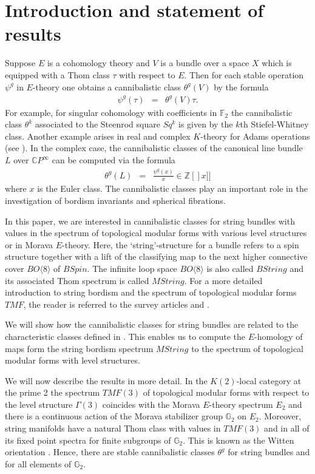 \documentclass{amsart}
\newcommand {\F}{{\mathbb F}}
\newcommand {\Z}{{\mathbb Z}}
\newcommand {\C}{{\mathbb C}}
\newcommand {\G}{{\mathbb G}}
\numberwithin{equation}{section}
\theoremstyle{definition}  %
\newtheorem{set theory}[thm]{Set Theoretic Prelude}
\begin{document}
\section{Introduction and statement of results}
Suppose $E$ is a cohomology theory and $V$ is a bundle over a  space $X$ which is equipped with a Thom class  $\tau$ with respect to $E$. Then for each stable operation $\psi^g$ in $E$-theory one obtains a cannibalistic class $\theta^g(V)$ by the formula 
\begin{eqnarray} \psi^g (\tau)&=&\theta^g (V) \tau.\end{eqnarray}
For example, for singular cohomology with coefficients in $\F_2$ the cannibalistic class $\theta^k$ associated to the Steenrod square $Sq^k$ is given by the $k$th Stiefel-Whitney class. Another example arises in real and complex   $K$-theory for Adams operations (see \cite{MR0153019}). In the complex case, the cannibalistic classes of the canonical  line bundle $L$ over $\C P^\infty$ can be computed via the formula
\begin{eqnarray}\label{Euler} \theta^g(L)&=& \frac{\psi^g (x)}{x}\in \Z[\!]x]\!]\end{eqnarray}
where $x$ is the Euler class.
The cannibalistic classes  play an important role in the investigation of bordism invariants and spherical fibrations.\par
In this paper, we are interested in cannibalistic classes for string bundles with values in the spectrum of topological modular forms with various level structures or in Morava $E$-theory. Here, the  `string'-structure for a bundle refers to a spin structure together with a lift of the classifying map to the next higher connective cover $BO\langle 8\rangle$ of $BSpin$. The infinite loop space $BO\langle8\rangle$ is also called $BString$ and its associated Thom spectrum is called $MString$.  For a more detailed introduction to string bordism and the spectrum of topological modular forms $TMF$, the reader is referred to the survey articles \cite{MR1989190} and \cite {MR2648680}.\par
We will show how the cannibalistic classes for string bundles  are related to the  characteristic classes defined in \cite{MR3448393}. This enables us  to compute the $E$-homology of maps form  the string bordism spectrum $MString$ to the spectrum of topological modular forms with level structures.  \par
We will  now describe the results in more detail. In the $K(2)$-local category at the prime 2 the spectrum $TMF(3)$ of topological modular forms with respect to the level structure $\Gamma(3)$ coincides with the Morava $E$-theory spectrum $E_2$ and there is a continuous action of the Morava stabilizer group $\G_2$ on $E_2$. Moreover, string manifolds have a natural Thom class with values in $TMF(3)$ and in all of its fixed point spectra for finite subgroups of $\G_2$. This is  known as the Witten orientation \cite{AHR10}. Hence, there are stable cannibalistic classes $\theta^g$ for string bundles and for all elements of $\G_2$. \par
\end{document}
